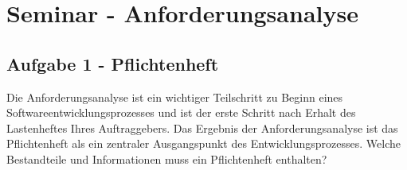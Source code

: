 
\section{Seminar - Anforderungsanalyse}

    \subsection{Aufgabe 1 - Pflichtenheft}
    
        \begin{aufgabe}
            Die Anforderungsanalyse ist ein wichtiger Teilschritt zu Beginn eines Softwareentwicklungsprozesses und ist der erste Schritt nach Erhalt des Lastenheftes Ihres Auftraggebers. Das Ergebnis der Anforderungsanalyse ist das Pflichtenheft als ein zentraler Ausgangspunkt des Entwicklungsprozesses. Welche Bestandteile und Informationen muss ein Pflichtenheft enthalten?
        \end{aufgabe}
        
